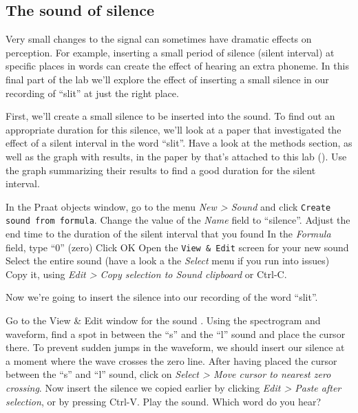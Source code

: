 \documentclass[a4paper, 9pt]{article}
\begin{document}
\subsection{The sound of silence}\label{the-sound-of-silence}

Very small changes to the signal can sometimes have dramatic effects on
perception. For example, inserting a small period of silence (silent
interval) at specific places in words can create the effect of hearing
an extra phoneme. In this final part of the lab we'll explore the effect
of inserting a small silence in our recording of ``slit'' at just the
right place.

First, we'll create a small silence to be inserted into the
 sound. To find out an appropriate duration for this
silence, we'll look at a paper that investigated the effect of a silent
interval in the word ``slit''. Have a look at the methods section, as
well as the graph with results, in the paper by \cite{Marcus1978} that's
attached to this lab (). Use the graph summarizing their
results to find a good duration for the silent interval.

\begin{exercise}
\action In the Praat objects window, go to the menu \emph{New > Sound} and click \texttt{Create sound from formula}.
\action Change the value of the \emph{Name} field to ``silence''. 
\action Adjust the end time to the duration of the silent interval that you found
\action In the \emph{Formula} field, type ``0'' (zero)
\action Click OK
\action Open the \texttt{View \& Edit} screen for your new sound
\action Select the entire sound (have a look a the \emph{Select} menu if you run into issues)
\action Copy it, using \emph{Edit > Copy selection to Sound clipboard} or Ctrl-C.
\end{exercise}

Now we're going to insert the silence into our recording of the word
``slit''.

\begin{exercise}
\action Go to the View \& Edit window for the sound .
\action Using the spectrogram and waveform, find a spot in between the ``s'' and the ``l'' sound and place the cursor there.
\action To prevent sudden jumps in the waveform, we should insert our silence at
a moment where the wave crosses the zero line. After having placed the cursor between the ``s'' and ``l'' sound, click on \emph{Select > Move cursor to nearest zero crossing}.
\action Now insert the silence we copied earlier by clicking \emph{Edit > Paste after selection}, or by pressing Ctrl-V.
\action Play the sound. Which word do you hear?
\end{exercise}

\printbibliography
\end{document}
